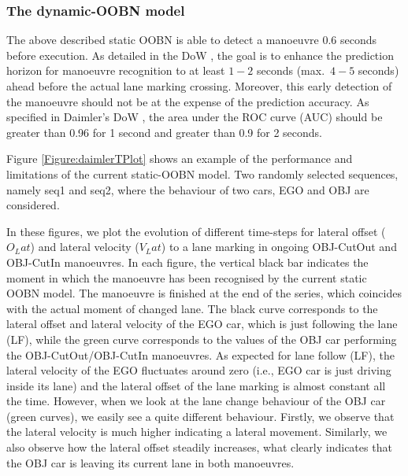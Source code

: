 \subsubsection*{The dynamic-OOBN model}

The above described static OOBN is able to detect a manoeuvre $0.6$ seconds before execution. As detailed in the DoW \cite{Fer14}, the goal is to enhance the prediction horizon for manoeuvre recognition to at least $1-2$ seconds (max.\ $4-5$ seconds) ahead before the actual lane marking crossing. Moreover, this early detection of the manoeuvre should not be at the expense of the prediction accuracy. As specified in Daimler's DoW \cite{Fer14}, the area under the ROC curve (AUC) should be greater than 0.96 for 1 second and greater than 0.9 for 2 seconds.

Figure \ref{Figure:daimlerTPlot} shows an example of the performance and limitations of the current static-OOBN model. Two randomly selected sequences, namely seq1 and seq2, where the behaviour of two cars, EGO and OBJ are considered. 



In these figures, we plot the evolution of different time-steps for lateral offset ($O_Lat$) and lateral velocity ($V_Lat$) to a lane marking in ongoing OBJ-CutOut and OBJ-CutIn manoeuvres. In each figure, the vertical black bar indicates the moment in which the manoeuvre has been recognised by the current static OOBN model. The manoeuvre is finished at the end of the series, which coincides with the actual moment of changed lane. The black curve corresponds to the lateral offset and lateral velocity of the EGO car, which is just following the lane (LF), while the green curve corresponds to the values of the OBJ car performing the OBJ-CutOut/OBJ-CutIn manoeuvres. As expected for lane follow (LF), the lateral velocity of the EGO fluctuates around zero (i.e., EGO car is just driving inside its lane) and the lateral offset of the lane marking is almost constant all the time. However, when we look at the lane change behaviour of the OBJ car (green curves), we easily see a quite different behaviour. Firstly, we observe that the lateral velocity is much  higher indicating a lateral movement. Similarly, we also observe how the lateral offset steadily increases, what clearly indicates that the OBJ car is leaving its current lane in both manoeuvres. 

